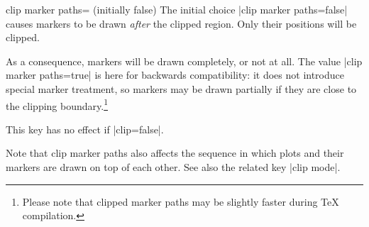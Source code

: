\begin{pgfplotskey}{clip marker paths= (initially false)}
    The initial choice |clip marker paths=false| causes markers to be drawn
    \emph{after} the clipped region. Only their positions will be clipped.

    As a consequence, markers will be drawn completely, or not at all. The
    value |clip marker paths=true| is here for backwards compatibility: it does
    not introduce special marker treatment, so markers may be drawn partially
    if they are close to the clipping boundary.\footnote{Please note that
    clipped marker paths may be slightly faster during \TeX{} compilation.}

    This key has no effect if |clip=false|.

    Note that clip marker paths also affects the sequence in which plots and
    their markers are drawn on top of each other. See also the related key
    |clip mode|.
\end{pgfplotskey}

